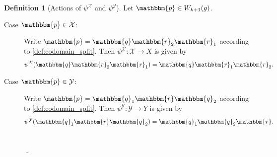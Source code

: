 \documentclass[11pt]{article}
\newcommand{\lrcornerqed}[0]{}
\renewcommand{\lrcornerqed}[0]{\hfill $\lrcorner$} %
\newcommand{\lrcornerqedequation}[0]{
        \\[-3.4em]
        \phantom{.}
        \lrcornerqed
        \\[-0.3em]
        }
\theoremstyle{definition} %
\newtheorem{definition}[thm]{Definition}
\numberwithin{equation}{section}
\begin{document}
\begin{definition}[Actions of $\psi^\mathcal X$ and $\psi^\mathcal Y$]
\label{def:psi}
Let $\mathbbm{p} \in W_{k+1}(g)$.
    \begin{description}
         \item[Case $\mathbbm{p} \in \mathcal{X}$:]
            Write $\mathbbm{p} = \mathbbm{q} \mathbbm{r}_2 \mathbbm{r}_1$ according to \cref{def:codomain_split}. Then $\psi^\mathcal X: \mathcal{X} \to X$ is given by 
            \begin{align}
            \psi^\mathcal X(\mathbbm{q} \mathbbm{r}_2 \mathbbm{r}_1) = \mathbbm{q} \mathbbm{r}_1 \mathbbm{r}_2.
        \end{align}

        \item[Case $\mathbbm{p} \in \mathcal{Y}$:]
            Write $\mathbbm{p} = \mathbbm{q}_1 \mathbbm{r} \mathbbm{q}_2$ according to \cref{def:codomain_split}. Then $\psi^\mathcal Y: \mathcal{Y} \to Y$ is given by 
            \begin{align}
            \psi^\mathcal Y(\mathbbm{q}_1 \mathbbm{r} \mathbbm{q}_2) = \mathbbm{q}_1 \mathbbm{q}_2 \mathbbm{r}.
             \end{align}
        \lrcornerqedequation
    \end{description}
\end{definition}
\end{document}
